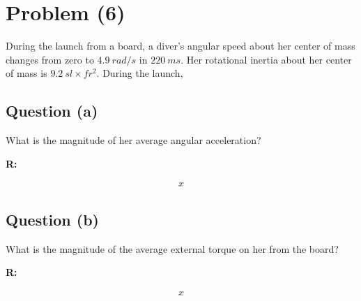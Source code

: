 \section{Problem (6)}
	During the launch from a board, a diver's angular speed about her center of mass changes from zero to $4.9 \ rad/s$ in $220 \ ms$. Her rotational inertia about her center of mass is $9.2 \ sl \times fr^{2}$. During the launch,

	\subsection{Question (a)}

		What is the magnitude of her average angular acceleration?

		\textbf{R:}

		\begin{align}
			x
		\end{align}

	\subsection{Question (b)}

		What is the magnitude of the average external torque on her from the board?

		\textbf{R:}

		\begin{align}
			x
		\end{align}

